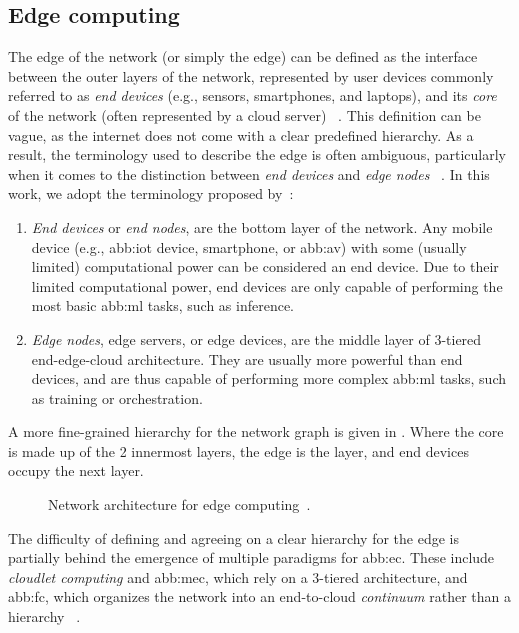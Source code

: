 \subsection{Edge computing}\label{sub:edge_computing}

The edge of the network (or simply the edge) can be defined as the interface
between the outer layers of the network,
represented by user devices commonly referred to as \emph{end devices}
(e.g., sensors, smartphones, and laptops),
and its \emph{core} of the network (often represented by a cloud server)%
~\cite{singhEdgeAISurvey2023}.
This definition can be vague, as the internet does not come with a clear predefined hierarchy.
As a result, the terminology used to describe the edge is often ambiguous,
particularly when it comes to the distinction
between \emph{end devices} and \emph{edge nodes}%
~\cite{wangEdgeAIConvergence2020}.
In this work, we adopt the terminology proposed by~\citet{wangEdgeAIConvergence2020}:

\begin{enumerate}
	\item \emph{End devices} or \emph{end nodes}, are the bottom layer of the network.
	      Any mobile device (e.g., \gls{abb:iot} device, smartphone, or \gls{abb:av})
	      with some (usually limited) computational power can be considered an end device.
	      Due to their limited computational power,
	      end devices are only capable of performing the most basic \gls{abb:ml} tasks,
	      such as inference.
	\item \emph{Edge nodes}, edge servers, or edge devices,
	      are the middle layer of 3-tiered end-edge-cloud architecture.
	      They are usually more powerful than end devices,
	      and are thus capable of performing more complex \gls{abb:ml} tasks,
	      such as training or orchestration.
\end{enumerate}

A more fine-grained hierarchy for the network graph is given in .
Where the core is made up of the 2 innermost layers,
the edge is the  layer, and end devices occupy the next layer.
\begin{figure}[hbt]
	\begin{center}
	\end{center}
	\caption{Network architecture for edge computing~\cite{zhouEdgeIntelligencePaving2019}.}%
	\label{fig:edge_architecture}
\end{figure}

The difficulty of defining and agreeing on a clear hierarchy for the edge
is partially behind the emergence of multiple paradigms for \gls{abb:ec}.
These include \emph{cloudlet computing} and \gls{abb:mec},
which rely on a 3-tiered architecture,
and \gls{abb:fc},
which organizes the network into an end-to-cloud \emph{continuum} rather than a hierarchy%
~\cite{singhEdgeAISurvey2023}.
